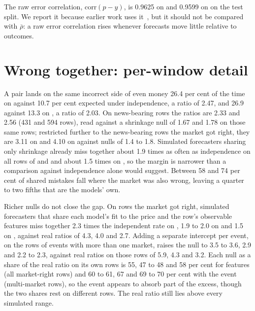 The raw error correlation, $\mathrm{corr}(p-y)$, is 0.9625 on \winB and 0.9599
on \winC on the test split. We report it because earlier work uses
it~\citep{spiro2026}, but it should not be compared with $\bar{\rho}$: a raw
error correlation rises whenever forecasts move little relative to outcomes.

\section{Wrong together: per-window detail}
\label{app:wrongtogether}
A pair lands on the same incorrect side of even money 26.4 per cent of the time
on \winB against 10.7 per cent expected under independence, a ratio of 2.47, and
26.9 against 13.3 on \winC, a ratio of 2.03. On news-bearing rows the ratios are
2.33 and 2.56 (431 and 594 rows), read against a shrinkage null of 1.67 and 1.78
on those same rows; restricted further to the news-bearing rows the market got
right, they are 3.11 on \winB and 4.10 on \winC against nulls of 1.4 to 1.8. Simulated forecasters sharing only shrinkage already miss together
about 1.9 times as often as independence on all rows of \winA and \winB and about 1.5 times on
\winC, so the margin is narrower than a comparison against independence alone
would suggest. Between 58 and 74 per cent of shared mistakes fall where the
market was also wrong, leaving a quarter to two fifths that are the models' own.

Richer nulls do not close the gap. On rows the market got right, simulated
forecasters that share each model's fit to the price and the row's observable
features miss together 2.3 times the independent rate on \winA, 1.9 to 2.0 on
\winB and 1.5 on \winC, against real ratios of 4.3, 4.0 and 2.7. Adding a
separate intercept per event, on the rows of events with more than one market,
raises the null to 3.5 to 3.6, 2.9 and 2.2 to 2.3, against real ratios on those
rows of 5.9, 4.3 and 3.2. Each null as a share of the real ratio on its own rows
is 55, 47 to 48 and 58 per cent for features (all market-right rows) and 60 to
61, 67 and 69 to 70 per cent with the event (multi-market rows), so the event
appears to absorb part of the excess, though the two shares rest on different
rows. The real ratio still lies
above every simulated range.

